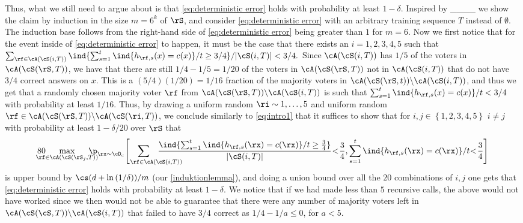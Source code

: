 Thus, what we still need to argue about is that \cref{eq:deterministic error} holds with probability at least $ 1-\delta $. Inspired by ____ we show the claim by induction in the size $ m=6^{k} $ of $ \rS $, and consider \cref{eq:deterministic error} with an arbitrary training sequence $ T $ instead of $ \emptyset $. The induction base follows from the right-hand side of \cref{eq:deterministic error} being greater than $ 1 $ for $ m=6 $. Now we first notice that for the event inside of \cref{eq:deterministic error} to happen, it must be the case that there exists an $ i =1,2,3,4,5$ such that 
$ \sum_{\rf\in \cA(\cS (i,T))} \ind\{\sum_{s=1}^{t} \ind\{h_{\rf,s}(x)=c(x)\}/t\geq 3/4\}/|\cS(i,T)|
       <3/4.
$
Since $ \cA(\cS(i,T)) $ has $ 1/5  $ of the voters in $ \cA(\cS(\rS,T)) $, we have that there are still $ 1/4-1/5 =1/20$ of the voters in $  \cA(\cS(\rS,T))$ not in $\cA(\cS(i,T))$ that do not have $ 3/4 $ correct answers on $ x $. This is a $ (5/4)(1/20)=1/16 $ fraction of the majority voters in $ \cA(\cS(\rS,t))\backslash \cA(\cS(i,T)) $, and thus we get that a randomly chosen majority voter $ \rf $ from $ \cA(\cS(\rS,T))\backslash \cA(\cS(i,T)) $ is such that  $\sum_{s=1}^{t} \ind\{h_{\rf,s}(x)=c(x)\}/t< 3/4$ with probability at least $ 1/16 $. Thus, by drawing a uniform random $ \ri\sim {1,\ldots,5} $ and uniform random $ \rf \in  \cA(\cS(\rS,T))\backslash \cA(\cS(\ri,T)) $,  we conclude similarly to \cref{eq:intro1} that it suffices to show that for $ i,j\in \left\{ 1,2,3,4,5  \right\}$  $ i\not=j $   with probability at least $ 1-\delta/20 $ over $ \rS $ that 
\begin{align}\label{eq:ourrecursion}
  80 \negmedspace \negmedspace \negmedspace \negmedspace \negmedspace \negmedspace \max_{\rf\in\cA(\cS(\rS_{j},T))} \negmedspace \negmedspace \negmedspace \negmedspace \negmedspace \negmedspace \p_{\rx\sim\cD_{c}}\Bigg[ \negmedspace \negmedspace \negmedspace \negmedspace \negmedspace \negmedspace \negmedspace \negmedspace \negmedspace \negmedspace \negmedspace \negmedspace \negmedspace \negmedspace   \sum_{ \quad\quad \quad \rf\in \cA(\cS (i,T))} \negmedspace \negmedspace \negmedspace \negmedspace \negmedspace \negmedspace \negmedspace \negmedspace \negmedspace \negmedspace \negmedspace \negmedspace \negmedspace \negmedspace \frac{\ind\{\sum_{s=1}^{t} \ind\{h_{\rf,s}(\rx)=c(\rx)\}/t\geq \frac{3}{4}\}}{|\cS(i,T)|}
  \negmedspace  <\negmedspace \frac{3}{4}, \sum_{s=1}^{t} \ind\{h_{\rf,s}(\rx)=c(\rx)\}/t\negmedspace<\negmedspace\frac{3}{4}\Bigg]
\end{align}
is upper bound by $ \cs (d+\ln{\left(1/\delta \right)})/m $ (our \cref{induktionlemma}), and doing a union bound over all the $ 20 $ combinations of $ i,j $ one gets that \cref{eq:deterministic error} holds with probability at least $1- \delta $. We notice that if we had made less than $ 5 $ recursive calls, the above would not have worked since we then would not be able to guarantee that there were any number of majority voters left in $ \cA(\cS(\cS,T))\backslash \cA(\cS(i,T)) $ that failed to have $ 3/4 $ correct as $ 1/4-1/a \leq0$, for $ a<5 $. 

